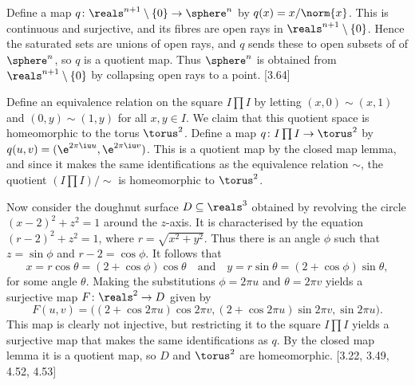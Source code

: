 \documentclass[article, a4paper, 11pt, oneside]{memoir}
\numberwithin{equation}{chapter}
\begin{document}
\begin{example}
    Define a map $q \colon \reals^{n+1} \setminus \{0\} \to \sphere^n$ by $q(x) = x/\norm{x}$. This is continuous and surjective, and its fibres are open rays in $\reals^{n+1} \setminus \{0\}$. Hence the saturated sets are unions of open rays, and $q$ sends these to open subsets of of $\sphere^n$, so $q$ is a quotient map. Thus $\sphere^n$ is obtained from $\reals^{n+1} \setminus \{0\}$ by collapsing open rays to a point. [3.64]
\end{example}


\begin{example}[Tori]
    Define an equivalence relation on the square $I \prod I$ by letting $(x,0) \sim (x,1)$ and $(0,y) \sim (1,y)$ for all $x,y \in I$. We claim that this quotient space is homeomorphic to the torus $\torus^2$. Define a map $q \colon I \prod I \to \torus^2$ by $q(u,v) = (\e^{2\pi\iu u}, \e^{2\pi\iu v})$. This is a quotient map by the closed map lemma, and since it makes the same identifications as the equivalence relation $\sim$, the quotient $(I \prod I)/{\sim}$ is homeomorphic to $\torus^2$.
    
    Now consider the doughnut surface $D \subseteq \reals^3$ obtained by revolving the circle $(x-2)^2 + z^2 = 1$ around the $z$-axis. It is characterised by the equation $(r-2)^2 + z^2 = 1$, where $r = \sqrt{x^2 + y^2}$. Thus there is an angle $\phi$ such that $z = \sin\phi$ and $r-2 = \cos\phi$. It follows that
    \begin{equation*}
        x = r\cos\theta = (2 + \cos\phi) \cos\theta
        \quad \text{and} \quad
        y = r\sin\theta = (2 + \cos\phi) \sin\theta,
    \end{equation*}
    for some angle $\theta$. Making the substitutions $\phi = 2\pi u$ and $\theta = 2\pi v$ yields a surjective map $F \colon \reals^2 \to D$ given by
    \begin{equation*}
        F(u,v) = \bigl(
            (2 + \cos 2\pi u) \cos 2\pi v,
            (2 + \cos 2\pi u) \sin 2\pi v,
            \sin 2\pi u
        \bigr).
    \end{equation*}
    This map is clearly not injective, but restricting it to the square $I \prod I$ yields a surjective map that makes the same identifications as $q$. By the closed map lemma it is a quotient map, so $D$ and $\torus^2$ are homeomorphic. [3.22, 3.49, 4.52, 4.53]
\end{example}
\end{document}
